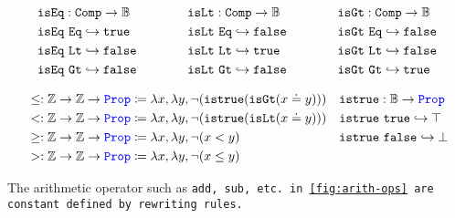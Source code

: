 \[
\begin{array}{l@{\hspace{4em}}l@{\hspace{4em}}l}
\begin{aligned}
  &\tt{isEq} : \tt{Comp} \ra \bb{B} \\
  &\tt{isEq}~\tt{Eq} \re \tt{true} \\
  &\tt{isEq}~\tt{Lt} \re \tt{false} \\
  &\tt{isEq}~\tt{Gt} \re \tt{false} \\
\end{aligned}
&
\begin{aligned}
  &\tt{isLt} : \tt{Comp} \ra \bb{B} \\
  &\tt{isLt}~\tt{Eq} \re \tt{false} \\
  &\tt{isLt}~\tt{Lt} \re \tt{true} \\
  &\tt{isLt}~\tt{Gt} \re \tt{false} \\
\end{aligned}
&
\begin{aligned}
  &\tt{isGt} : \tt{Comp} \ra \bb{B} \\
  &\tt{isGt}~\tt{Eq} \re \tt{false} \\
  &\tt{isGt}~\tt{Lt} \re \tt{false} \\
  &\tt{isGt}~\tt{Gt} \re \tt{true} \\
\end{aligned}
\end{array}
\]

\begin{align*}
&\leq: \mathbb{Z} \rightarrow \mathbb{Z} \rightarrow \textcolor{blue}{\texttt{\upshape{Prop}}}  \coloneq \lambda x,\lambda y, \neg (\texttt{istrue}(\texttt{isGt}(x \doteq y))) & &\texttt{istrue} : \mathbb{B} \rightarrow \textcolor{blue}{\texttt{\upshape{Prop}}} \\
&<: \mathbb{Z} \rightarrow \mathbb{Z} \rightarrow \textcolor{blue}{\texttt{\upshape{Prop}}}  \coloneq \lambda x,\lambda y, \neg (\texttt{istrue}(\texttt{isLt}(x \doteq y))) & &\texttt{istrue}~\texttt{true} \hookrightarrow \top \\
&\geq: \mathbb{Z} \rightarrow \mathbb{Z} \rightarrow \textcolor{blue}{\texttt{\upshape{Prop}}}  \coloneq \lambda x,\lambda y, \neg (x < y) & &\texttt{istrue}~\texttt{false} \hookrightarrow \bot \\
&>: \mathbb{Z} \rightarrow \mathbb{Z} \rightarrow \textcolor{blue}{\texttt{\upshape{Prop}}}  \coloneq \lambda x,\lambda y, \neg (x \leq y) & & \\
\end{align*}

The arithmetic operator such as \tt{add}, \tt{sub}, etc. in \cref{fig:arith-ops} are constant defined by rewriting rules.

  


